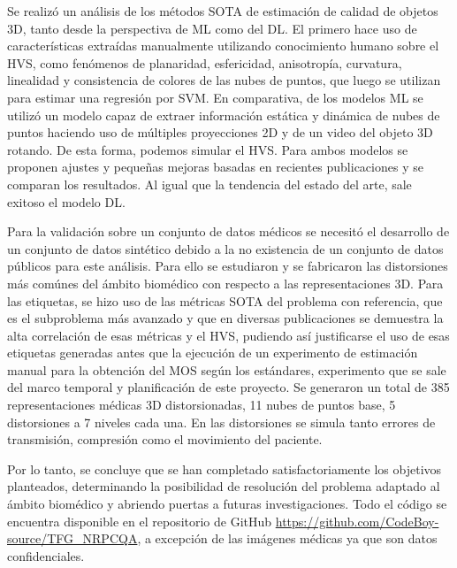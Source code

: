 Se realizó un análisis de los métodos SOTA de estimación de calidad de objetos 
3D, tanto desde la perspectiva de ML como del DL. El primero hace uso de características 
extraídas manualmente utilizando conocimiento humano sobre el HVS, como fenómenos 
de planaridad, esfericidad, anisotropía, curvatura, linealidad y consistencia de 
colores de las nubes de puntos, que luego se utilizan para estimar una regresión por 
SVM. En comparativa, de los modelos ML se utilizó un modelo capaz de extraer 
información estática y dinámica de nubes de puntos haciendo uso de múltiples 
proyecciones 2D y de un video del objeto 3D rotando. De esta forma, podemos 
simular el HVS. Para ambos modelos se proponen ajustes y pequeñas mejoras basadas 
en recientes publicaciones y se comparan los resultados. 
Al igual que la tendencia del estado del arte, sale exitoso el modelo DL. 

Para la validación sobre un conjunto de datos médicos se necesitó el desarrollo 
de un conjunto de datos sintético debido a la no existencia de un conjunto de 
datos públicos para este análisis. Para ello se estudiaron y se fabricaron las distorsiones más 
comúnes del ámbito biomédico con respecto a las representaciones 3D. Para las etiquetas, 
se hizo uso de las métricas SOTA del problema con referencia, que es el subproblema 
más avanzado y que en diversas publicaciones se demuestra la alta correlación 
de esas métricas y el HVS, pudiendo así justificarse el uso de esas 
etiquetas generadas antes que la ejecución de un experimento de estimación 
manual para la obtención del MOS según los estándares, experimento que se 
sale del marco temporal y planificación de este proyecto. Se generaron 
un total de 385 representaciones médicas 3D distorsionadas, 11 nubes de puntos 
base, 5 distorsiones a 7 niveles cada una. En las distorsiones se simula 
tanto errores de transmisión, compresión como el movimiento del paciente.


Por lo tanto, se concluye que se han completado satisfactoriamente los objetivos 
planteados, determinando la posibilidad de resolución del problema adaptado 
al ámbito biomédico y abriendo puertas a futuras investigaciones. Todo el código
se encuentra disponible en el repositorio de GitHub \url{https://github.com/CodeBoy-source/TFG_NRPCQA},
a excepción de las imágenes médicas ya que son datos confidenciales.

